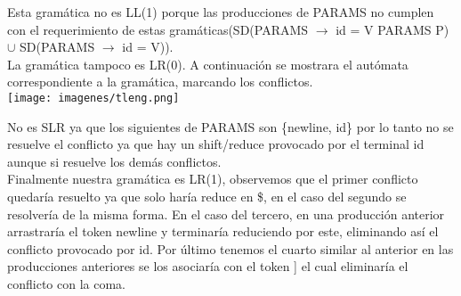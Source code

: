 Esta gramática no es LL(1) porque las producciones de PARAMS no cumplen con el
requerimiento de estas gramáticas(SD(PARAMS $\rightarrow$ id = V PARAMS P) $\cup$ SD(PARAMS $\rightarrow$ id = V)).\\

La gramática tampoco es LR(0). A continuación se mostrara el autómata correspondiente a la gramática, marcando los conflictos.\\


\texttt{[image: imagenes/tleng.png]}


No es SLR ya que los siguientes de PARAMS son \{newline, id\} por lo tanto no se resuelve el conflicto ya que hay un
shift/reduce provocado por el terminal id aunque si resuelve los demás conflictos.\\

Finalmente nuestra gramática es LR(1), observemos que el primer conflicto quedaría resuelto ya que solo haría reduce en
 \$, en el caso del segundo se resolvería de la misma forma. En el caso del tercero, en una producción anterior arrastraría
 el token newline y terminaría reduciendo por este, eliminando así el conflicto provocado por id. Por último tenemos el cuarto
similar al anterior en las producciones anteriores se los asociaría con el token ] el cual eliminaría el conflicto con la coma.
